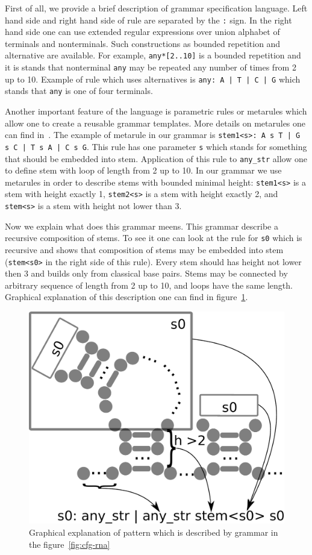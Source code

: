 \documentclass[a4paper,twoside]{article}
\begin{document}
First of all, we provide a brief description of grammar specification language.
Left hand side and right hand side of rule are separated by the \verb|:| sign.
In the right hand side one can use extended regular expressions over union alphabet of terminals and nonterminals.
Such constructions as bounded repetition and alternative are available.
For example, \verb|any*[2..10]| is a bounded repetition and it is stands that nonterminal \verb|any| may be repeated any number of times from 2 up to 10.
Example of rule which uses alternatives is \texttt{any: A | T | C | G} which stands that \verb|any| is one of four terminals.

Another important feature of the language is parametric rules or metarules which allow one to create a reusable grammar templates.
More details on metarules one can find in~\cite{Thiemann:2008:MCG:1389449.1389465}.
The example of metarule in our grammar is \texttt{stem1<s>: A s T | G s C | T s A | C s G}.
This rule has one parameter \verb|s| which stands for something that should be embedded into stem.
Application of this rule to \verb|any_str| allow one to define stem with loop of length from 2 up to 10.
In our grammar we use metarules in order to describe stems with bounded minimal height: \verb|stem1<s>| is a stem with height exactly 1,  \verb|stem2<s>| is a stem with height exactly 2, and \verb|stem<s>| is a stem with height not lower than 3.

Now we explain what does this grammar meens.
This grammar describe a recursive composition of stems.
To see it one can look at the rule for \verb|s0| which is recursive and shows that composition of stems may be embedded into stem (\verb |stem<s0>| in the right side of this rule).
Every stem should has height not lower then 3 and builds only from classical base pairs.
Stems may be connected by arbitrary sequence of length from 2 up to 10, and loops have the same length.
Graphical explanation of this description one can find in figure~\ref{fig:cfg-rna-graphical}.

\begin{figure}
\centering
\includegraphics[width=.45\textwidth]{figures/16sgrammar.pdf}
\caption{Graphical explanation of pattern which is described by grammar in the figure~\ref{fig:cfg-rna}}
\label{fig:cfg-rna-graphical}
\end{figure}
\end{document}

